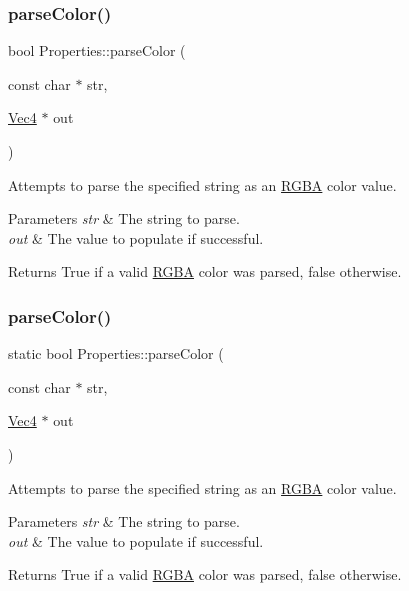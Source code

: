\subsubsection{\texorpdfstring{parse\+Color()}{parseColor()}\hspace{0.1cm}{\footnotesize\ttfamily [3/4]}}
{\footnotesize\ttfamily bool Properties\+::parse\+Color (\begin{DoxyParamCaption}\item[{const char $\ast$}]{str,  }\item[{\hyperlink{classVec4}{Vec4} $\ast$}]{out }\end{DoxyParamCaption})\hspace{0.3cm}{\ttfamily [static]}}

Attempts to parse the specified string as an \hyperlink{structRGBA}{R\+G\+BA} color value.


\begin{DoxyParams}{Parameters}
{\em str} & The string to parse. \\
\hline
{\em out} & The value to populate if successful.\\
\hline
\end{DoxyParams}
\begin{DoxyReturn}{Returns}
True if a valid \hyperlink{structRGBA}{R\+G\+BA} color was parsed, false otherwise. 
\end{DoxyReturn}
\mbox{\label{classProperties_a703e785854ee11acf85f95632f6fff08}} 
\subsubsection{\texorpdfstring{parse\+Color()}{parseColor()}\hspace{0.1cm}{\footnotesize\ttfamily [4/4]}}
{\footnotesize\ttfamily static bool Properties\+::parse\+Color (\begin{DoxyParamCaption}\item[{const char $\ast$}]{str,  }\item[{\hyperlink{classVec4}{Vec4} $\ast$}]{out }\end{DoxyParamCaption})\hspace{0.3cm}{\ttfamily [static]}}

Attempts to parse the specified string as an \hyperlink{structRGBA}{R\+G\+BA} color value.


\begin{DoxyParams}{Parameters}
{\em str} & The string to parse. \\
\hline
{\em out} & The value to populate if successful.\\
\hline
\end{DoxyParams}
\begin{DoxyReturn}{Returns}
True if a valid \hyperlink{structRGBA}{R\+G\+BA} color was parsed, false otherwise. 
\end{DoxyReturn}
\mbox{\label{classProperties_a9576885844b44630f266dec2e1046c50}} 
